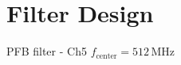 \documentclass[ignorenonframetext,12pt]{beamer}
\begin{document}
\section{Filter Design}
\begin{frame}{PFB filter - Ch5 $f_\text{center}= 512\,\text{MHz}$}
				\begin{center}
				\end{center}
				\vspace{-1.2cm}
				\begin{center}
				\end{center}
				\vspace{-1.8cm}
				\begin{columns}
								\begin{column}{0.5\textwidth}
				\begin{center}

\end{center}
\end{column}
\end{columns}
\end{frame}
\end{document}
